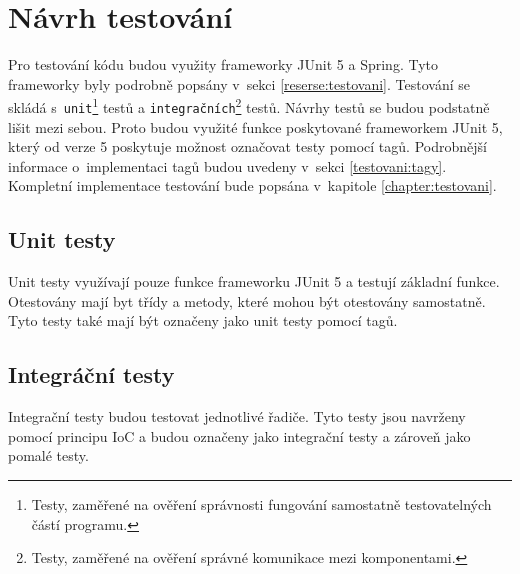     
\section{Návrh testování}\label{navrh:testovani}
    Pro testování kódu budou využity frameworky JUnit 5 a Spring. Tyto frameworky byly podrobně popsány v~sekci \ref{reserse:testovani}. Testování se skládá s~\texttt{unit}\footnote{Testy, zaměřené na ověření správnosti fungování samostatně testovatelných částí programu.} testů a \texttt{integračních}\footnote{Testy, zaměřené na ověření správné komunikace mezi komponentami.} testů. Návrhy testů se budou podstatně lišit mezi sebou. Proto budou využité funkce poskytované frameworkem JUnit 5, který od verze 5 poskytuje možnost označovat testy pomocí tagů.\cite{junit-tags} Podrobnější informace o~implementaci tagů budou uvedeny v~sekci \ref{testovani:tagy}. Kompletní implementace testování bude popsána v~kapitole \ref{chapter:testovani}.
    
    \subsection{Unit testy}
        Unit testy využívají pouze funkce frameworku JUnit 5 a testují základní funkce. Otestovány mají byt třídy a metody, které mohou být otestovány samostatně. Tyto testy také mají být označeny jako unit testy pomocí tagů.  %
        
    \subsection{Integráční testy}
        Integrační testy budou testovat jednotlivé řadiče. Tyto testy jsou navrženy pomocí principu IoC a budou označeny jako integrační testy a zároveň jako pomalé testy.


